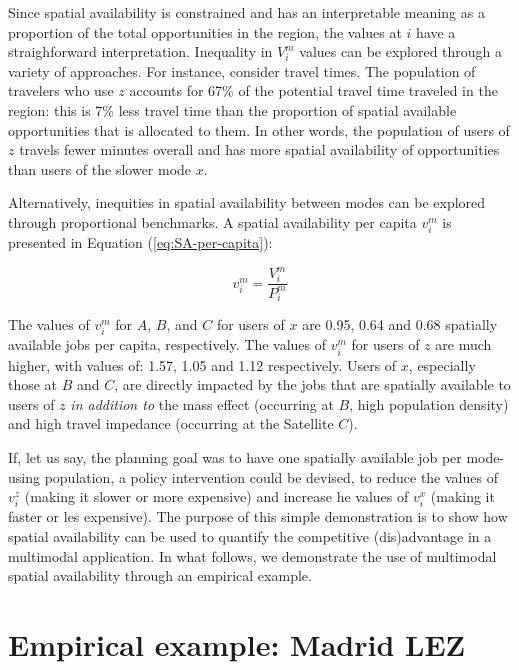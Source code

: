 \documentclass[10pt,letterpaper]{article}
\begin{document}
Since spatial availability is constrained and has an interpretable
meaning as a proportion of the total opportunities in the region, the
values at \(i\) have a straighforward interpretation. Inequality in
\(V_i^m\) values can be explored through a variety of approaches. For
instance, consider travel times. The population of travelers who use
\(z\) accounts for 67\% of the potential travel time traveled in the
region: this is 7\% less travel time than the proportion of spatial
available opportunities that is allocated to them. In other words, the
population of users of \(z\) travels fewer minutes overall and has more
spatial availability of opportunities than users of the slower mode
\(x\).

Alternatively, inequities in spatial availability between modes can be
explored through proportional benchmarks. A spatial availability per
capita \(v_i^m\) is presented in Equation (\ref{eq:SA-per-capita}):

\begin{equation}
\label{eq:SA-per-capita}
v_{i}^m = \frac{V_{i}^m}{P_{i}^m}
\end{equation}

The values of \(v_i^m\) for \(A\), \(B\), and \(C\) for users of \(x\)
are 0.95, 0.64 and 0.68 spatially available jobs per capita,
respectively. The values of \(v_i^m\) for users of \(z\) are much
higher, with values of: 1.57, 1.05 and 1.12 respectively. Users of
\(x\), especially those at \(B\) and \(C\), are directly impacted by the
jobs that are spatially available to users of \(z\) \emph{in addition
to} the mass effect (occurring at \(B\), high population density) and
high travel impedance (occurring at the Satellite \(C\)).

If, let us say, the planning goal was to have one spatially available
job per mode-using population, a policy intervention could be devised,
to reduce the values of \(v_i^z\) (making it slower or more expensive)
and increase he values of \(v_i^x\) (making it faster or les expensive).
The purpose of this simple demonstration is to show how spatial
availability can be used to quantify the competitive (dis)advantage in a
multimodal application. In what follows, we demonstrate the use of
multimodal spatial availability through an empirical example.

\hypertarget{empirical-example-madrid-lez}{%
\section{Empirical example: Madrid
LEZ}\label{empirical-example-madrid-lez}}
\end{document}
